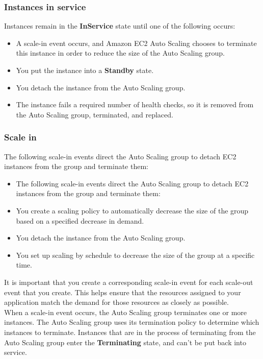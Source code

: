 \documentclass[12pt, letterpaper, twoside]{article}
\begin{document}
\subsubsection{Instances in service}
Instances remain in the \textbf{InService} state until one of the following occurs:
\begin{itemize}
	\item A scale-in event occurs, and Amazon EC2 Auto Scaling chooses to terminate this instance in order to reduce 
		the size of the Auto Scaling group.
		
	\item You put the instance into a \textbf{Standby} state.

	\item You detach the instance from the Auto Scaling group.

	\item The instance fails a required number of health checks, so it is removed from the Auto Scaling group, 
		terminated, and replaced.
\end{itemize}

\subsubsection{Scale in}
The following scale-in events direct the Auto Scaling group to detach EC2 instances from the group and terminate them:
\begin{itemize}
	\item The following scale-in events direct the Auto Scaling group to detach EC2 instances from the group and 
		terminate them:
		
	\item You create a scaling policy to automatically decrease the size of the group based on a specified 
		decrease in demand.

	\item You detach the instance from the Auto Scaling group.

	\item You set up scaling by schedule to decrease the size of the group at a specific time.
\end{itemize}

It is important that you create a corresponding scale-in event for each scale-out event that you create. This 
helps ensure that the resources assigned to your application match the demand for those resources as closely as 
possible.\\

When a scale-in event occurs, the Auto Scaling group terminates one or more instances. The Auto Scaling group 
uses its termination policy to determine which instances to terminate. Instances that are in the process of 
terminating from the Auto Scaling group enter the \textbf{Terminating} state, and can't be put back into service.\\
\end{document}
